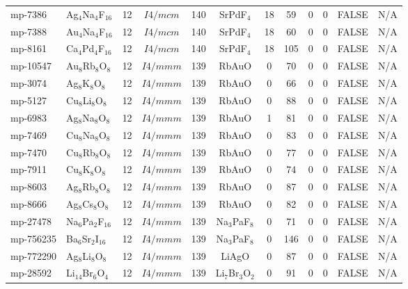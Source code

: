 {\begin{longtable}{llcccccccccc}
    mp-7386 & Ag$_{4}$Na$_{4}$F$_{16}$ & 12    & $I4/mcm$ & 140   & SrPdF$_{4}$ & 18    & 59    & 0     & 0     & FALSE & N/A \\
    mp-7388 & Au$_{4}$Na$_{4}$F$_{16}$ & 12    & $I4/mcm$ & 140   & SrPdF$_{4}$ & 18    & 60    & 0     & 0     & FALSE & N/A \\
    mp-8161 & Ca$_{4}$Pd$_{4}$F$_{16}$ & 12    & $I4/mcm$ & 140   & SrPdF$_{4}$ & 18    & 105   & 0     & 0     & FALSE & N/A \\
    mp-10547 & Au$_{8}$Rb$_{8}$O$_{8}$ & 12    & $I4/mmm$ & 139   & RbAuO & 0     & 70    & 0     & 0     & FALSE & N/A \\
    mp-3074 & Ag$_{8}$K$_{8}$O$_{8}$ & 12    & $I4/mmm$ & 139   & RbAuO & 0     & 66    & 0     & 0     & FALSE & N/A \\
    mp-5127 & Cu$_{8}$Li$_{8}$O$_{8}$ & 12    & $I4/mmm$ & 139   & RbAuO & 0     & 88    & 0     & 0     & FALSE & N/A \\
    mp-6983 & Ag$_{8}$Na$_{8}$O$_{8}$ & 12    & $I4/mmm$ & 139   & RbAuO & 1     & 81    & 0     & 0     & FALSE & N/A \\
    mp-7469 & Cu$_{8}$Na$_{8}$O$_{8}$ & 12    & $I4/mmm$ & 139   & RbAuO & 0     & 83    & 0     & 0     & FALSE & N/A \\
    mp-7470 & Cu$_{8}$Rb$_{8}$O$_{8}$ & 12    & $I4/mmm$ & 139   & RbAuO & 0     & 77    & 0     & 0     & FALSE & N/A \\
    mp-7911 & Cu$_{8}$K$_{8}$O$_{8}$ & 12    & $I4/mmm$ & 139   & RbAuO & 0     & 74    & 0     & 0     & FALSE & N/A \\
    mp-8603 & Ag$_{8}$Rb$_{8}$O$_{8}$ & 12    & $I4/mmm$ & 139   & RbAuO & 0     & 87    & 0     & 0     & FALSE & N/A \\
    mp-8666 & Ag$_{8}$Cs$_{8}$O$_{8}$ & 12    & $I4/mmm$ & 139   & RbAuO & 0     & 82    & 0     & 0     & FALSE & N/A \\
    mp-27478 & Na$_{6}$Pa$_{2}$F$_{16}$ & 12    & $I4/mmm$ & 139   & Na$_{3}$PaF$_{8}$ & 0     & 71    & 0     & 0     & FALSE & N/A \\
    mp-756235 & Ba$_{6}$Sr$_{2}$I$_{16}$ & 12    & $I4/mmm$ & 139   & Na$_{3}$PaF$_{8}$ & 0     & 146   & 0     & 0     & FALSE & N/A \\
    mp-772290 & Ag$_{8}$Li$_{8}$O$_{8}$ & 12    & $I4/mmm$ & 139   & LiAgO & 0     & 87    & 0     & 0     & FALSE & N/A \\
    mp-28592 & Li$_{14}$Br$_{6}$O$_{4}$ & 12    & $I4/mmm$ & 139   & Li$_{7}$Br$_{3}$O$_{2}$ & 0     & 91    & 0     & 0     & FALSE & N/A \\

\end{longtable}}
